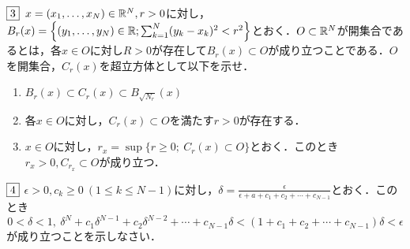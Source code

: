 \documentclass[dvipdfmx, leqno]{jsreport}
\begin{document}
\begin{tcolorbox}$\fbox{3}$
    $x= (x_1, \ldots, x_N)\in \mathbb{R}^N, r> 0$に対し，$B_r(x)= \left\{(y_1, \ldots, y_N)\in \mathbb{R}; \sum_{k= 1}^N (y_k- x_k)^2< r^2\right\}$とおく．$O\subset\mathbb{R}^N$が開集合であるとは，各$x\in O$に対し$R> 0$が存在して$B_r(x)\subset O$が成り立つことである．$O$を開集合，$C_r(x)$を超立方体として以下を示せ．
\begin{enumerate}
    \item $B_r(x)\subset C_r(x)\subset B_{\sqrt{N_r}}(x)$
    \item 各$x\in O$に対し，$C_r(x)\subset O$を満たす$r> 0$が存在する．
    \item $x\in O$に対し，$r_x= \sup\{r\ge 0;\ C_r(x)\subset O\}$とおく．このとき$r_x> 0, C_{r_x}\subset O$が成り立つ．
\end{enumerate}
\end{tcolorbox}
\begin{tcolorbox}$\fbox{4}$
    $\epsilon> 0, c_k\ge 0\ (1\le k\le N- 1)$に対し，$\delta= \frac{\epsilon}{\epsilon+ a+ c_1+ c_2+ \cdots+ c_{N- 1}}$とおく．このとき
\begin{equation*}
    0< \delta< 1,\ \delta^N+ c_1\delta^{N- 1}+ c_2\delta^{N- 2}+ \cdots+ c_{N- 1}\delta< (1+ c_1+ c_2+ \cdots+ c_{N- 1})\delta< \epsilon
\end{equation*}
    が成り立つことを示しなさい．
\end{tcolorbox}
\end{document}
